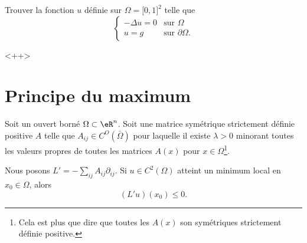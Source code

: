 \begin{example}
    Trouver la fonction \( u\) définie sur \( \Omega= \mathopen[ 0 , 1 \mathclose]^2\) telle que
    \begin{equation}
        \begin{cases}
            -\Delta u=0    &   \text{sur } \Omega\\
            u=g    &    \text{sur }\partial \Omega.
        \end{cases}
    \end{equation}
    
\end{example}
<++>

\section{Principe du maximum}

\begin{lemma}        \label{LEMooSPVUooDQOeom}
    Soit un ouvert borné \( \Omega\subset \eR^n\). Soit une matrice symétrique strictement définie positive \( A\) telle que \( A_{ij}\in C^O(\bar \Omega)\) pour laquelle il existe \( \lambda>0\) minorant toutes les valeurs propres de toutes les matrices \( A(x)\) pour \( x\in \Omega\)\footnote{Cela est plus que dire que toutes les \( A(x)\) son symétriques strictement définie positive.}.

    Nous posons \( L'=-\sum_{ij}A_{ij}\partial_{ij}\). Si \( u\in C^2(\Omega)\) atteint un minimum local en \( x_0\in \Omega\), alors 
    \begin{equation}
        (L'u)(x_0)\leq 0.
    \end{equation}
\end{lemma}

